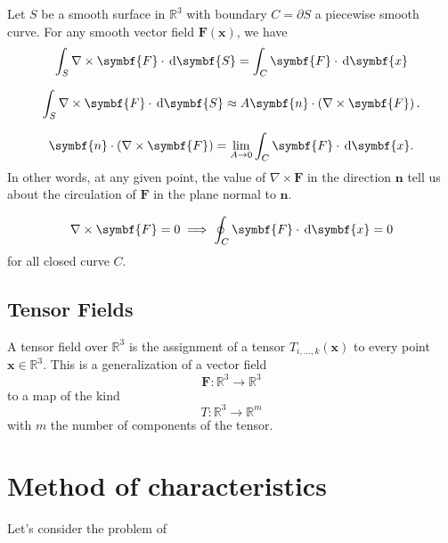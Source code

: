 Let $S$ be a smooth surface in $\mathbb{R}^{3}$ with boundary $C=\partial S$ a piecewise
smooth curve.
For any smooth vector field $\symbf{F}\left(\symbf{x}\right)$, we have
\begin{equation*}
	\int_{S}
	\nabla\times\symbf{F}\cdot\dl{\symbf{S}}=
	\int_{C}
	\symbf{F}\cdot\dl{\symbf{x}}
\end{equation*}

\begin{equation*}
	\int_{S}
	\nabla\times\symbf{F}\cdot\dl{\symbf{S}}\approx
	A\symbf{n}\cdot\left(\nabla\times\symbf{F}\right).
\end{equation*}

\begin{equation*}
	\symbf{n}\cdot\left(\nabla\times\symbf{F}\right)=
	\lim_{A\to0}
	\int_{C}\symbf{F}\cdot\dl{\symbf{x}}.
\end{equation*}
In other words, at any given point, the value of $\nabla\times\symbf{F}$ in the direction $\symbf{n}$
tell us about the circulation of $\symbf{F}$ in the plane normal to $\symbf{n}$.

\begin{equation*}
	\nabla\times\symbf{F}=0\implies
	\oint_{C}\symbf{F}\cdot\dl{\symbf{x}}=0
\end{equation*}
for all closed curve $C$.

\subsection{Tensor Fields}

A tensor field over $\mathbb{R}^{3}$ is the assignment of a tensor $T_{i,\dotsc,k}\left(\symbf{x}\right)$
to every point $\symbf{x}\in\mathbb{R}^{3}$.
This is a generalization of a vector field
\begin{equation*}
	\symbf{F}\colon\mathbb{R}^{3}\to\mathbb{R}^{3}
\end{equation*}
to a map of the kind
\begin{equation*}
	T\colon\mathbb{R}^{3}\to\mathbb{R}^{m}
\end{equation*}
with $m$ the number of components of the tensor.

\section{Method of characteristics}

\cite{Choksi2022,Arrigo2023}

Let's consider the problem of

